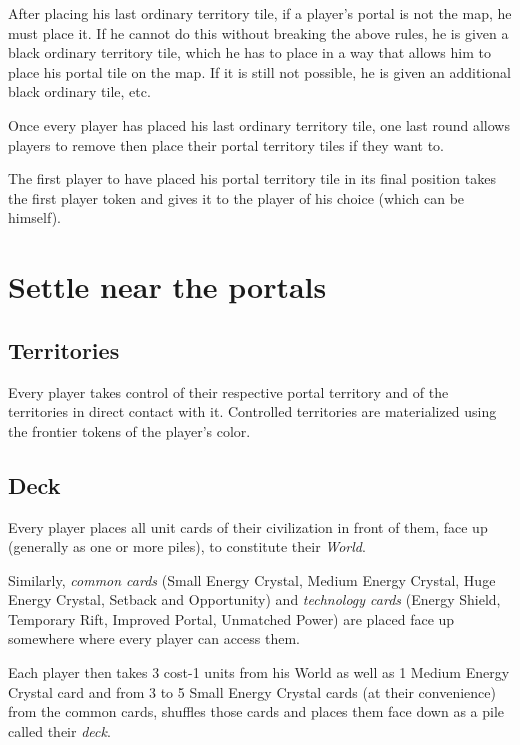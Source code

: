 \documentclass[a4paper]{article}
\begin{document}
        After placing his last ordinary territory tile,
        if a player's portal is not the map, he must place it.
        If he cannot do this without breaking the above rules,
        he is given a black ordinary territory tile,
        which he has to place in a way that allows him to place his portal tile on the map.
        If it is still not possible, he is given an additional black ordinary tile, etc.
        
        Once every player has placed his last ordinary territory tile,
        one last round allows players to remove then place their portal territory tiles
        if they want to.
        
        The first player to have placed his portal territory tile in its final position
        takes the first player token and gives it to the player of his choice
        (which can be himself).
    

\section{Settle near the portals}
    \subsection{Territories}
        Every player takes control of their respective portal territory
        and of the territories in direct contact with it.
        Controlled territories are materialized using the frontier tokens
        of the player's color.
        
    \subsection{Deck}
        Every player places all unit cards of their civilization in front of them,
        face up (generally as one or more piles), to constitute their \textit{World}.

        Similarly, \textit{common cards} (Small Energy Crystal, Medium Energy Crystal,
        Huge Energy Crystal, Setback and Opportunity) and \textit{technology cards}
        (Energy Shield, Temporary Rift, Improved Portal, Unmatched Power)
        are placed face up somewhere where every player can access them.
        
        Each player then takes  3 cost-1 units from his World as well as
        1 Medium Energy Crystal card and from 3 to 5 Small Energy Crystal cards
        (at their convenience) from the common cards,
        shuffles those cards and places them face down
        as a pile called their \textit{deck}.
        
\end{document}
